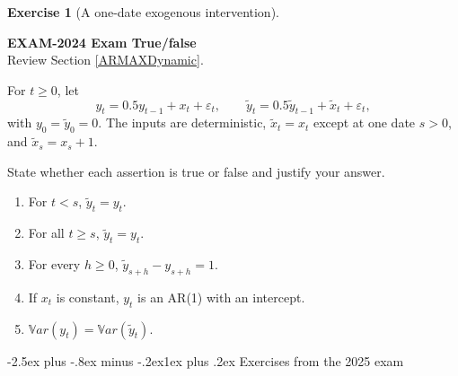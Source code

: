 \documentclass[
  11pt,
]{book}
\makeatletter
\providecommand{\tightlist}{%
  \setlength{\itemsep}{0pt}\setlength{\parskip}{0pt}}
\renewcommand\subsection{\@startsection{subsection}{2}{\z@}
  {-2.5ex plus -.8ex minus -.2ex}{1ex plus .2ex}
  {\normalfont\large\bfseries\color{TextbookInk}}}
\theoremstyle{definition}
\theoremstyle{definition}
\theoremstyle{definition}
\newtheorem{exercise}{Exercise}[chapter]
\theoremstyle{definition}
\theoremstyle{remark}
\makeatother
\begin{document}
\begin{exercisebox}

\begin{exercise}[A one-date exogenous intervention]
\protect\hypertarget{exr:ex-exam2024-dynamic-multiplier}{}\label{exr:ex-exam2024-dynamic-multiplier}

\textbf{EXAM-2024 \textbar{} Exam \textbar{} True/false}\\
Review Section \ref{ARMAXDynamic}.

For \(t\ge0\), let
\[y_t=0.5y_{t-1}+x_t+\varepsilon_t,\qquad \widetilde y_t=0.5\widetilde y_{t-1}+\widetilde x_t+\varepsilon_t,\]
with \(y_0=\widetilde y_0=0\). The inputs are deterministic, \(\widetilde x_t=x_t\) except at one date \(s>0\), and \(\widetilde x_s=x_s+1\).

State whether each assertion is true or false and justify your answer.

\begin{enumerate}
\def\labelenumi{\arabic{enumi}.}
\tightlist
\item
  For \(t<s\), \(\widetilde y_t=y_t\).
\item
  For all \(t\ge s\), \(\widetilde y_t=y_t\).
\item
  For every \(h\ge0\), \(\widetilde y_{s+h}-y_{s+h}=1\).
\item
  If \(x_t\) is constant, \(y_t\) is an AR(1) with an intercept.
\item
  \(\mathbb{V}ar(y_t)=\mathbb{V}ar(\widetilde y_t)\).
\end{enumerate}

\end{exercise}

\end{exercisebox}

\subsection{Exercises from the 2025 exam}\label{exercises-from-the-2025-exam}

\end{document}
